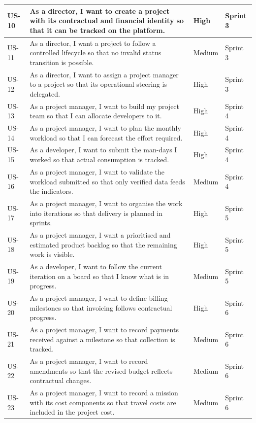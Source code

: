\begin{longtable}{|m{1.1cm}|m{9.2cm}|m{1.9cm}|m{1.6cm}|}
\hline
US-10 & As a director, I want to create a project with its contractual and financial identity so that it can be tracked on the platform. & High & Sprint 3 \\
\hline
US-11 & As a director, I want a project to follow a controlled lifecycle so that no invalid status transition is possible. & Medium & Sprint 3 \\
\hline
US-12 & As a director, I want to assign a project manager to a project so that its operational steering is delegated. & High & Sprint 3 \\
\hline
US-13 & As a project manager, I want to build my project team so that I can allocate developers to it. & High & Sprint 4 \\
\hline
US-14 & As a project manager, I want to plan the monthly workload so that I can forecast the effort required. & High & Sprint 4 \\
\hline
US-15 & As a developer, I want to submit the man-days I worked so that actual consumption is tracked. & High & Sprint 4 \\
\hline
US-16 & As a project manager, I want to validate the workload submitted so that only verified data feeds the indicators. & Medium & Sprint 4 \\
\hline
US-17 & As a project manager, I want to organise the work into iterations so that delivery is planned in sprints. & High & Sprint 5 \\
\hline
US-18 & As a project manager, I want a prioritised and estimated product backlog so that the remaining work is visible. & High & Sprint 5 \\
\hline
US-19 & As a developer, I want to follow the current iteration on a board so that I know what is in progress. & Medium & Sprint 5 \\
\hline
US-20 & As a project manager, I want to define billing milestones so that invoicing follows contractual progress. & High & Sprint 6 \\
\hline
US-21 & As a project manager, I want to record payments received against a milestone so that collection is tracked. & Medium & Sprint 6 \\
\hline
US-22 & As a project manager, I want to record amendments so that the revised budget reflects contractual changes. & Medium & Sprint 6 \\
\hline
US-23 & As a project manager, I want to record a mission with its cost components so that travel costs are included in the project cost. & Medium & Sprint 6 \\

\end{longtable}
